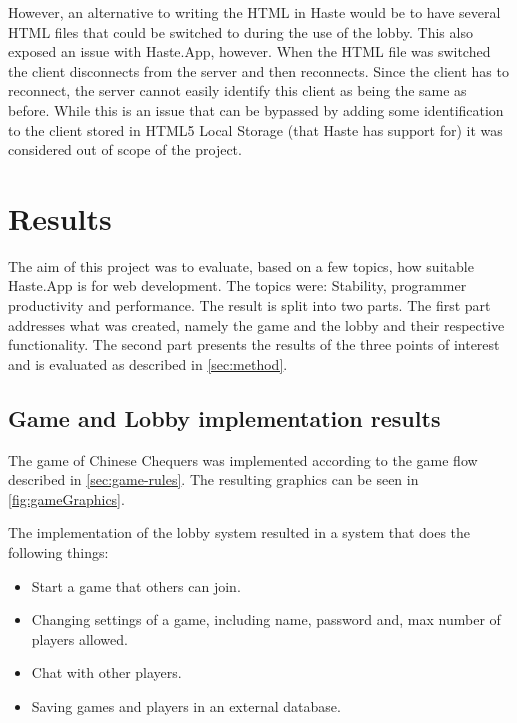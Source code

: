 \documentclass[a4paper]{article}
\begin{document}
However, an alternative to writing the HTML in Haste would be to have several HTML files that could be switched to during the use of the lobby. This also exposed an issue with Haste.App, however. When the HTML file was switched the client disconnects from the server and then reconnects. Since the client has to reconnect, the server cannot easily identify this client as being the same as before. While this is an issue that can be bypassed by adding some identification to the client stored in HTML5 Local Storage (that Haste has support for) it was considered out of scope of the project.



\section{Results}
The aim of this project was to evaluate, based on a few topics, how suitable Haste.App is for web development. The topics were: Stability, programmer productivity and performance. The result is split into two parts. The first part addresses what was created, namely the game and the lobby and their respective functionality. The second part presents the results of the three points of interest and is evaluated as described in \cref{sec:method}.

\subsection{Game and Lobby implementation results}
\label{sub:game-lobby-results}
The game of Chinese Chequers was implemented according to the game flow described in \cref{sec:game-rules}. The resulting graphics can be seen in \cref{fig:gameGraphics}.



The implementation of the lobby system resulted in a system that does the following things:
\begin{itemize}[noitemsep]
    \item Start a game that others can join.
    \item Changing settings of a game, including name, password and, max number of players allowed.
    \item Chat with other players.
    \item Saving games and players in an external database.\\
\end{itemize}
\end{document}
